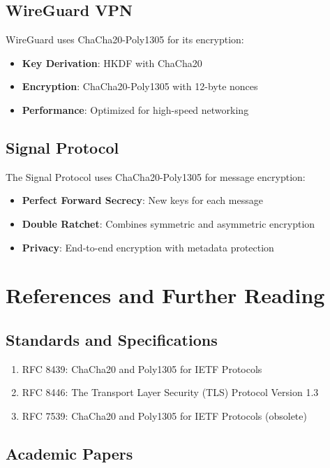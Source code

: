 \documentclass[11pt,a4paper]{article}
\begin{document}
\subsection{WireGuard VPN}

WireGuard uses ChaCha20-Poly1305 for its encryption:
\begin{itemize}
    \item \textbf{Key Derivation}: HKDF with ChaCha20
    \item \textbf{Encryption}: ChaCha20-Poly1305 with 12-byte nonces
    \item \textbf{Performance}: Optimized for high-speed networking
\end{itemize}

\subsection{Signal Protocol}

The Signal Protocol uses ChaCha20-Poly1305 for message encryption:
\begin{itemize}
    \item \textbf{Perfect Forward Secrecy}: New keys for each message
    \item \textbf{Double Ratchet}: Combines symmetric and asymmetric encryption
         \item \textbf{Privacy}: End-to-end encryption with metadata protection
\end{itemize}

\section{References and Further Reading}

\subsection{Standards and Specifications}

\begin{enumerate}
    \item RFC 8439: ChaCha20 and Poly1305 for IETF Protocols
    \item RFC 8446: The Transport Layer Security (TLS) Protocol Version 1.3
    \item RFC 7539: ChaCha20 and Poly1305 for IETF Protocols (obsolete)
\end{enumerate}

\subsection{Academic Papers}
\end{document}

